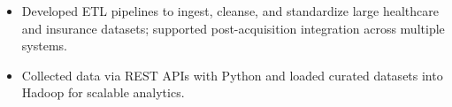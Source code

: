\documentclass[10pt]{resume}
\begin{document}
\vspace{-0.9em}
\begin{itemize}

\item Developed ETL pipelines to ingest, cleanse, and standardize large healthcare and insurance datasets; supported post-acquisition integration across multiple systems.  
\item Collected data via REST APIs with Python and loaded curated datasets into Hadoop for scalable analytics.

\end{itemize}
\end{document}
